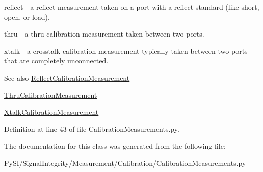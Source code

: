 \begin{DoxyItemize}
\item \textquotesingle{}reflect\textquotesingle{} -\/ a reflect measurement taken on a port with a reflect standard (like short, open, or load).
\item \textquotesingle{}thru\textquotesingle{} -\/ a thru calibration measurement taken between two ports.
\item \textquotesingle{}xtalk\textquotesingle{} -\/ a crosstalk calibration measurement typically taken between two ports that are completely unconnected. \begin{DoxySeeAlso}{See also}
\hyperlink{classSignalIntegrity_1_1Measurement_1_1Calibration_1_1CalibrationMeasurements_1_1ReflectCalibrationMeasurement}{Reflect\+Calibration\+Measurement} 

\hyperlink{classSignalIntegrity_1_1Measurement_1_1Calibration_1_1CalibrationMeasurements_1_1ThruCalibrationMeasurement}{Thru\+Calibration\+Measurement} 

\hyperlink{classSignalIntegrity_1_1Measurement_1_1Calibration_1_1CalibrationMeasurements_1_1XtalkCalibrationMeasurement}{Xtalk\+Calibration\+Measurement} 
\end{DoxySeeAlso}

\end{DoxyItemize}

Definition at line 43 of file Calibration\+Measurements.\+py.



The documentation for this class was generated from the following file\+:\begin{DoxyCompactItemize}
\item 
Py\+S\+I/\+Signal\+Integrity/\+Measurement/\+Calibration/Calibration\+Measurements.\+py\end{DoxyCompactItemize}
